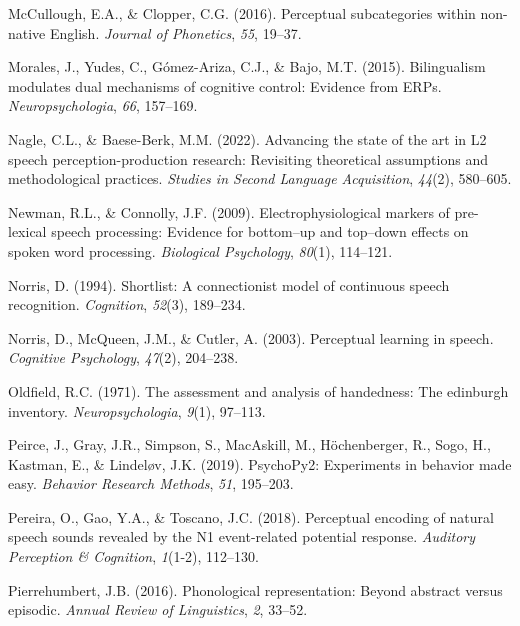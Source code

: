 \documentclass[
  12pt,
  twoside]{article}
\newlength{\cslhangindent}
\newlength{\cslentryspacingunit} %
\newenvironment{CSLReferences}[2] %
 {%
  \setlength{\parindent}{0pt}
  \ifodd #1
  \let\oldpar\par
  \def\par{\hangindent=\cslhangindent\oldpar}
  \fi
  \setlength{\parskip}{#2\cslentryspacingunit}
 }%
 {}
\begin{document}
\begin{CSLReferences}{1}{0}
\leavevmode{}%
McCullough, E.A., \& Clopper, C.G. (2016). Perceptual subcategories within non-native {English}. \emph{Journal of Phonetics}, \emph{55}, 19--37.

\leavevmode{}%
Morales, J., Yudes, C., Gómez-Ariza, C.J., \& Bajo, M.T. (2015). Bilingualism modulates dual mechanisms of cognitive control: Evidence from ERPs. \emph{Neuropsychologia}, \emph{66}, 157--169.

\leavevmode{}%
Nagle, C.L., \& Baese-Berk, M.M. (2022). Advancing the state of the art in L2 speech perception-production research: Revisiting theoretical assumptions and methodological practices. \emph{Studies in Second Language Acquisition}, \emph{44}(2), 580--605.

\leavevmode{}%
Newman, R.L., \& Connolly, J.F. (2009). Electrophysiological markers of pre-lexical speech processing: Evidence for bottom--up and top--down effects on spoken word processing. \emph{Biological Psychology}, \emph{80}(1), 114--121.

\leavevmode{}%
Norris, D. (1994). Shortlist: A connectionist model of continuous speech recognition. \emph{Cognition}, \emph{52}(3), 189--234.

\leavevmode{}%
Norris, D., McQueen, J.M., \& Cutler, A. (2003). Perceptual learning in speech. \emph{Cognitive Psychology}, \emph{47}(2), 204--238.

\leavevmode{}%
Oldfield, R.C. (1971). The assessment and analysis of handedness: The edinburgh inventory. \emph{Neuropsychologia}, \emph{9}(1), 97--113.

\leavevmode{}%
Peirce, J., Gray, J.R., Simpson, S., MacAskill, M., Höchenberger, R., Sogo, H., Kastman, E., \& Lindeløv, J.K. (2019). PsychoPy2: Experiments in behavior made easy. \emph{Behavior Research Methods}, \emph{51}, 195--203.

\leavevmode{}%
Pereira, O., Gao, Y.A., \& Toscano, J.C. (2018). Perceptual encoding of natural speech sounds revealed by the N1 event-related potential response. \emph{Auditory Perception \& Cognition}, \emph{1}(1-2), 112--130.

\leavevmode{}%
Pierrehumbert, J.B. (2016). Phonological representation: Beyond abstract versus episodic. \emph{Annual Review of Linguistics}, \emph{2}, 33--52.


\end{CSLReferences}
\end{document}
